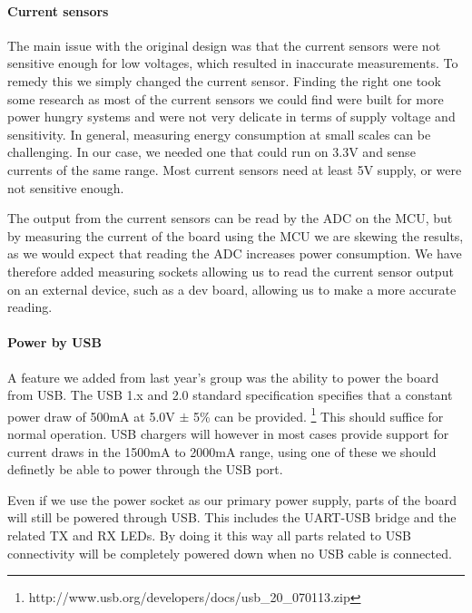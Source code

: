 \paragraph{Current sensors} \label{psu:current_sensors}
The main issue with the original design was that the current sensors were not
sensitive enough for low voltages, which resulted in inaccurate measurements. To
remedy this we simply changed the current sensor. Finding the right one took
some research as most of the current sensors we could find were built for more
power hungry systems and were not very delicate in terms of supply voltage and
sensitivity. In general, measuring energy consumption at small scales 
 can be challenging. 
In our case, we needed one that could run on 3.3V and
sense currents of the same range. Most current sensors need at least 5V supply,
or were not sensitive enough.

The output from the current sensors can be read by the ADC on the MCU, but by
measuring the current of the board using the MCU we are skewing the results, as 
we would expect that reading the ADC increases power consumption. We have 
therefore added measuring sockets allowing us to read the current sensor output
on an external device, such as a dev board, allowing us to make a more accurate
reading.

\paragraph{Power by USB} \label{psu:usb}
A feature we added from last year's group was the ability to power the board
from USB. The USB 1.x and 2.0 standard specification specifies that a constant
power draw of 500mA at 5.0V $\pm$ 5\% can be provided.
\footnote{http://www.usb.org/developers/docs/usb_20_070113.zip}
 This should suffice for normal operation.
USB chargers will however in most cases provide support for current draws in
the 1500mA to 2000mA range, using one of these we should definetly be able to
power through the USB port.

Even if we use the power socket as our primary power supply, parts of the board
will still be powered through USB. This includes the UART-USB bridge and the 
related TX and RX LEDs. By doing it this way all parts related to USB connectivity
will be completely powered down when no USB cable is connected.